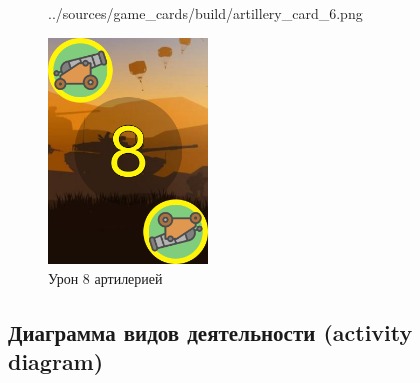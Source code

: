 \documentclass[12pt, a4paper, simple]{eskdtext}
\begin{document}
\begin{figure}[p!h]
\begin{minipage}{0.24\textwidth}
                {../sources/game_cards/build/artillery_card_6.png}
            \caption{Урон 6 артилерией}
            \label{fig:artillery_card_6}
        \end{minipage}
        \begin{minipage}{0.24\textwidth}
            \centering
            \includegraphics[height=6cm]
                {../sources/game_cards/build/artillery_card_8.png}
            \caption{Урон 8 артилерией}
            \label{fig:artillery_card_8}
        \end{minipage}
    \end{figure}


    
    \newpage
    \subsection{Диаграмма видов деятельности (activity diagram)}
\end{document}
